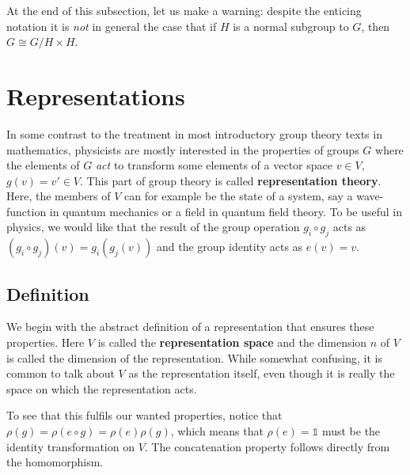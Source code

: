 \documentclass[notes.tex]{subfiles}
\begin{document}
At the end of this subsection, let us make a warning: despite the enticing notation it is {\it not} in general the case that if $H$ is a normal subgroup to $G$, then $G\cong G/H\times H$.


\section{Representations}
\label{sec:rep}
In some contrast to the treatment in most introductory group theory texts in mathematics, physicists are mostly interested in the properties of groups $G$ where the elements of $G$ {\it act} to transform some elements of a vector space $v\in V$, $g(v) = v' \in V$. This part of group theory is called {\bf representation theory}. Here, the members of $V$ can for example be the state of a system, say a wave-function in quantum mechanics or a field in quantum field theory. 
To be useful in physics, we would like that the result of the group operation $g_i \circ g_j$ acts as $(g_i\circ g_j)(v) = g_i(g_j(v))$ and the group identity acts as $e(v) = v$.


\subsection{Definition}
We begin with the abstract definition of a representation that ensures these properties. 
Here $V$ is called the {\bf representation space} and the dimension $n$ of $V$ is called the dimension of the representation. While somewhat confusing, it is common to talk about $V$ as the representation itself, even though it is really the space on which the representation acts. 

To see that this fulfils our wanted properties, notice that $\rho(g)=\rho(e\circ g)=\rho(e)\rho(g)$, which means that $\rho(e)= \mathbb{1}$ must be the identity transformation on $V$. The concatenation property follows directly from the homomorphism.
\end{document}
